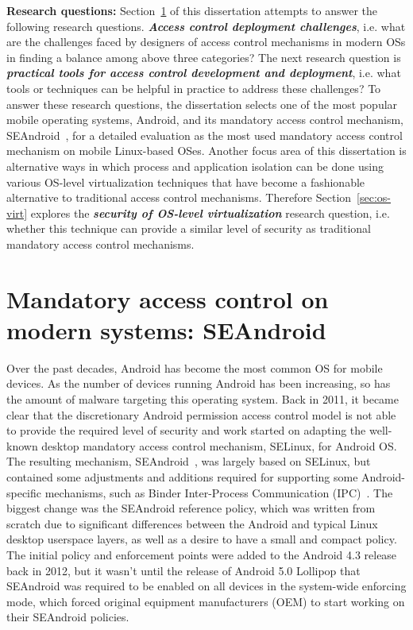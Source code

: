 \textbf{Research questions:}   Section~\ref{sec:seandroid} of this dissertation attempts to answer the following research questions. \textbf{\textit{Access control deployment challenges}}, i.e. what are the challenges faced by designers of access control mechanisms in modern OSs in finding a balance among above three categories? The next research question is \textbf{\textit{practical tools for access control development and deployment}}, i.e. what tools or techniques can be helpful in practice to address these challenges? To answer these research questions, the dissertation selects one of the most popular mobile operating systems, Android, and its mandatory access control mechanism, SEAndroid~\cite{smalley12}, for a detailed evaluation as the most used mandatory access control mechanism on mobile Linux-based OSes. Another focus area of this dissertation is alternative ways in which process and application isolation can be done using various OS-level virtualization  techniques that have become a fashionable alternative to traditional access control mechanisms. Therefore Section~\ref{sec:os-virt} explores the \textit{\textbf{security of OS-level virtualization}} research question, i.e. whether this technique can provide a similar level of security as traditional mandatory access control mechanisms. 


\section{Mandatory access control on modern systems: SEAndroid}
\label{sec:seandroid}

Over the past decades, Android has become the most common OS for mobile devices. As the number of devices running Android has been increasing, so has the amount of malware targeting this operating system. Back in 2011, it became clear that the discretionary Android permission access control model is not able to provide the required level of security and work started on adapting the well-known desktop mandatory access control mechanism, SELinux, for Android OS. The resulting mechanism, SEAndroid~\cite{smalley12}, was largely based on SELinux, but contained some adjustments and additions required for supporting some Android-specific mechanisms, such as Binder Inter-Process Communication (IPC)~\cite{binder}. The biggest change was the SEAndroid reference policy, which was written from scratch due to significant differences between the Android and typical Linux desktop userspace layers, as well as a desire to have a small and compact policy. The initial policy and enforcement points were added to the Android 4.3 release back in 2012, but it wasn't until the release of Android 5.0 Lollipop that SEAndroid was required to be enabled on all devices in the system-wide enforcing mode, which forced original equipment manufacturers (OEM) to start working on their SEAndroid policies. 

